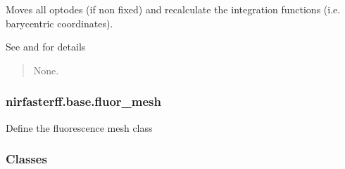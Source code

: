 \documentclass[letterpaper,10pt,english]{sphinxmanual}
\begin{document}
\begin{fulllineitems}

\begin{fulllineitems}
\label{\detokenize{_autosummary/nirfasterff.base.dcs_mesh.dcsmesh:nirfasterff.base.dcs_mesh.dcsmesh.touch_optodes}}
\pysigstartsignatures
\pysiglinewithargsret
{}
{}
{}
\pysigstopsignatures
\sphinxAtStartPar
Moves all optodes (if non fixed) and recalculate the integration functions (i.e. barycentric coordinates).

\sphinxAtStartPar
See {\hyperref[\detokenize{_autosummary/nirfasterff.base.optodes.optode:nirfasterff.base.optodes.optode.touch_sources}]{}} and {\hyperref[\detokenize{_autosummary/nirfasterff.base.optodes.optode:nirfasterff.base.optodes.optode.touch_detectors}]{}} for details
\begin{quote}\begin{description}
\sphinxAtStartPar
None.

\end{description}\end{quote}

\end{fulllineitems}


\end{fulllineitems}


\sphinxstepscope


\subsubsection{nirfasterff.base.fluor\_mesh}
\label{\detokenize{_autosummary/nirfasterff.base.fluor_mesh:module-nirfasterff.base.fluor_mesh}}\label{\detokenize{_autosummary/nirfasterff.base.fluor_mesh:nirfasterff-base-fluor-mesh}}\label{\detokenize{_autosummary/nirfasterff.base.fluor_mesh::doc}}
\sphinxAtStartPar
Define the fluorescence mesh class
\subsubsection*{Classes}
\end{document}
